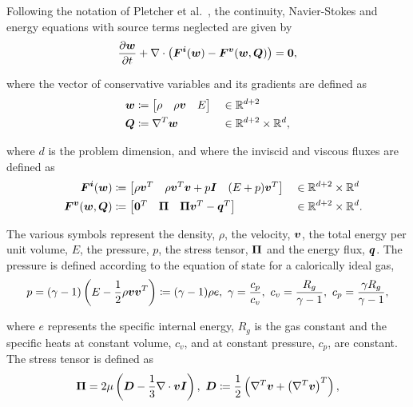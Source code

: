 Following the notation of Pletcher et al.~\cite[Chapter ]{pletcher1997}, the continuity, Navier-Stokes and energy equations with source terms neglected are given by
\begin{align} \label{eq:NavierStokes_std}
\frac{\partial \varv{w}}{\partial t} + 
\nabla \cdot \left( \varv{F^i}(\varv{w}) - \varv{F^v}(\varv{w},\varv{Q}) \right) = \vect{0},
\end{align}

where the vector of conservative variables and its gradients are defined as
\begin{alignat}{3}
\varv{w} & \coloneqq \begin{bmatrix} \rho & \rho\varv{v} & E \end{bmatrix}
&& \in \mathbb{R}^{d+2} \nonumber \\
\varv{Q} & \coloneqq \nabla^T \varv{w}
&& \in \mathbb{R}^{d+2} \times \mathbb{R}^{d}, \label{eq:Gradients}
\end{alignat}

where $d$ is the problem dimension, and where the inviscid and viscous fluxes are defined as
\begin{alignat}{4}
&& \mathit{\bm{{F^i}}}(\mathit{\bm{{w}}}) & \coloneqq
\begin{bmatrix} \rho\mathit{\bm{{v}}}^T & \rho \mathit{\bm{{v}}}^T \mathit{\bm{{v}}} + p \mathit{\bm{{I}}} & (E+p) \mathit{\bm{{v}}}^T \end{bmatrix}
&& \in \mathbb{R}^{d+2} \times \mathbb{R}^{d} \label{eq:F_inviscid} \\
&& \mathit{\bm{{F^v}}}(\mathit{\bm{{w}}},\mathit{\bm{{Q}}}) & \coloneqq
\begin{bmatrix} \mathbf{{0}}^T & \mathit{\bm{{\Pi}}} & \mathit{\bm{{\Pi}}} \mathit{\bm{{v}}}^T - \mathit{\bm{{q}}}^T \end{bmatrix}
&& \in \mathbb{R}^{d+2} \times \mathbb{R}^{d}. \label{eq:F_viscous}
\end{alignat}

The various symbols represent the density, $\rho$, the velocity, $\mathit{\bm{{v}}}$, the total energy per unit volume, $E$, the pressure, $p$, the stress tensor, $\mathit{\bm{{\Pi}}}$ and the energy flux, $\mathit{\bm{{q}}}$. The pressure is defined according to the equation of state for a calorically ideal gas,
\begin{align*}
p 
=
(\gamma-1) \left( E - \frac{1}{2} \rho \mathit{\bm{{v}}} \mathit{\bm{{v}}}^T \right)
\coloneqq
(\gamma-1) \rho e,\ \gamma = \frac{c_p}{c_v},\ c_v = \frac{R_g}{\gamma-1},\ c_p = \frac{\gamma R_g}{\gamma-1},
\end{align*}

where $e$ represents the specific internal energy, $R_g$ is the gas constant and the specific heats at constant volume, $c_v$, and at constant pressure, $c_p$, are constant. The stress tensor is defined as
\begin{align*}
\varv{\Pi} = 2\mu \left( \varv{D} - \frac{1}{3} \nabla \cdot \varv{v} \varv{I} \right),\ \varv{D} \coloneqq \frac{1}{2} \left(\nabla^T \varv{v} + \left(\nabla^T \varv{v}\right)^T \right),
\end{align*}

